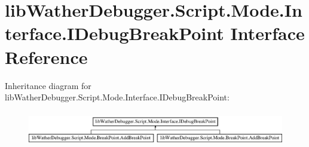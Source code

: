\hypertarget{interfacelib_wather_debugger_1_1_script_1_1_mode_1_1_interface_1_1_i_debug_break_point}{\section{lib\+Wather\+Debugger.\+Script.\+Mode.\+Interface.\+I\+Debug\+Break\+Point Interface Reference}
\label{interfacelib_wather_debugger_1_1_script_1_1_mode_1_1_interface_1_1_i_debug_break_point}
}
Inheritance diagram for lib\+Wather\+Debugger.\+Script.\+Mode.\+Interface.\+I\+Debug\+Break\+Point\+:\begin{figure}[H]
\begin{center}
\leavevmode
\includegraphics[height=1.551247cm]{interfacelib_wather_debugger_1_1_script_1_1_mode_1_1_interface_1_1_i_debug_break_point}
\end{center}
\end{figure}
